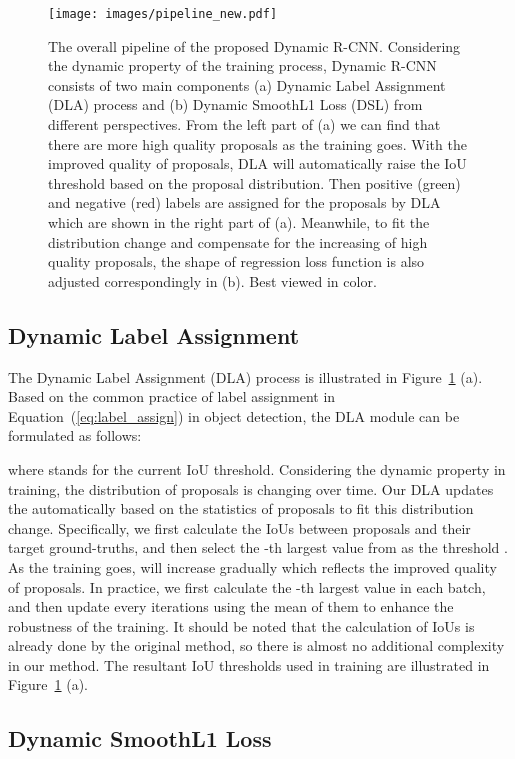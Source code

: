\documentclass[runningheads]{llncs}
\begin{document}
\begin{figure}[!t]
    \centering
    \texttt{[image: images/pipeline\_new.pdf]}
    \caption{The overall pipeline of the proposed Dynamic R-CNN. Considering the dynamic property of the training process, Dynamic R-CNN consists of two main components (a) Dynamic Label Assignment (DLA) process and (b) Dynamic SmoothL1 Loss (DSL) from different perspectives. From the left part of (a) we can find that there are more high quality proposals as the training goes. With the improved quality of proposals, DLA will automatically raise the IoU threshold based on the proposal distribution. Then positive (green) and negative (red) labels are assigned for the proposals by DLA which are shown in the right part of (a). Meanwhile, to fit the distribution change and compensate for the increasing of high quality proposals, the shape of regression loss function is also adjusted correspondingly in (b). Best viewed in color.}
    \label{fig:pipeline}
\end{figure}


\subsection{Dynamic Label Assignment}

The Dynamic Label Assignment (DLA) process is illustrated in Figure~\ref{fig:pipeline} (a). Based on the common practice of label assignment in Equation~(\ref{eq:label_assign}) in object detection, the DLA module can be formulated as follows:


where  stands for the current IoU threshold. Considering the dynamic property in training, the distribution of proposals is changing over time. Our DLA updates the  automatically based on the statistics of proposals to fit this distribution change. Specifically, we first calculate the IoUs  between proposals and their target ground-truths, and then select the -th largest value from  as the threshold . As the training goes,  will increase gradually which reflects the improved quality of proposals. In practice, we first calculate the -th largest value in each batch, and then update  every  iterations using the mean of them to enhance the robustness of the training. It should be noted that the calculation of IoUs is already done by the original method, so there is almost no additional complexity in our method.
The resultant IoU thresholds used in training are illustrated in Figure~\ref{fig:pipeline} (a).


\subsection{Dynamic SmoothL1 Loss}
\end{document}
